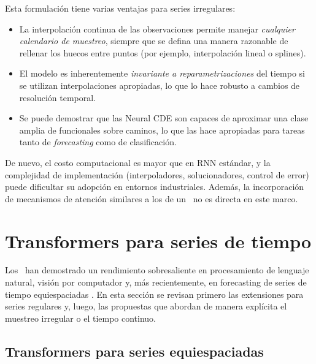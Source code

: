 Esta formulación tiene varias ventajas para series irregulares:
\begin{itemize}
    \item La interpolación continua de las observaciones permite manejar \textit{cualquier calendario de muestreo}, siempre que se defina una manera razonable de rellenar los huecos entre puntos (por ejemplo, interpolación lineal o splines).
    \item El modelo es inherentemente \textit{invariante a reparametrizaciones} del tiempo si se utilizan interpolaciones apropiadas, lo que lo hace robusto a cambios de resolución temporal.
    \item Se puede demostrar que las Neural CDE son capaces de aproximar una clase amplia de funcionales sobre caminos, lo que las hace apropiadas para tareas tanto de \textit{forecasting} como de clasificación.
\end{itemize}

De nuevo, el costo computacional es mayor que en RNN estándar, y la complejidad de implementación (interpoladores, solucionadores, control de error) puede dificultar su adopción en entornos industriales. Además, la incorporación de mecanismos de atención similares a los de un \Transformer\ no es directa en este marco.

\section{Transformers para series de tiempo}
\label{sec:estado-arte-transformers}

Los \Transformers\ han demostrado un rendimiento sobresaliente en procesamiento de lenguaje natural, visión por computador y, más recientemente, en forecasting de series de tiempo equiespaciadas \cite{vaswani2017attention}. En esta sección se revisan primero las extensiones para series regulares y, luego, las propuestas que abordan de manera explícita el muestreo irregular o el tiempo continuo.

\subsection{Transformers para series equiespaciadas}


